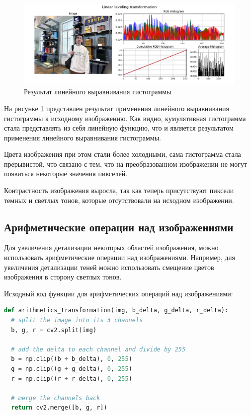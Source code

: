 \begin{figure}[H]
    \centering
    \includegraphics[width=\textwidth]{../results/Linear leveling transformation.png}
    \caption{Результат линейного выравнивания гистограммы}
    \label{fig:linear}
\end{figure}

На рисунке \ref{fig:linear} представлен результат применения линейного выравнивания гистограммы к исходному изображению. Как видно, кумулятивная гистограмма стала представлять из себя линейную функцию, что и является результатом применения линейного выравнивания гистограммы. 

Цвета изображения при этом стали более холодными, сама гистограмма стала прерывистой, что связано с тем, что на преобразованном изображении не могут появиться некоторые значения пикселей. 

Контрастность изображения выросла, так как теперь присутствуют пиксели темных и светлых тонов, которые отсутствовали на исходном изображении. 

\subsection{Арифметические операции над изображениями}

Для увеличения детализации некоторых областей изображения, можно использовать арифметические операции над изображениями. Например, для увеличения детализации теней можно использовать смещение цветов изображения в сторону светлых тонов.

Исходный код функции для арифметических операций над изображениями:

\begin{lstlisting}[language=Python]
def arithmetics_transformation(img, b_delta, g_delta, r_delta):
  # split the image into its 3 channels
  b, g, r = cv2.split(img)

  # add the delta to each channel and divide by 255
  b = np.clip((b + b_delta), 0, 255) 
  g = np.clip((g + g_delta), 0, 255) 
  r = np.clip((r + r_delta), 0, 255) 

  # merge the channels back
  return cv2.merge([b, g, r])
\end{lstlisting}


